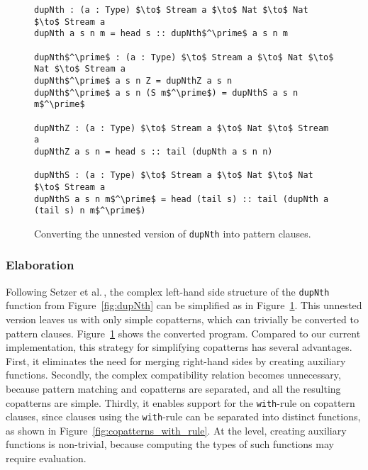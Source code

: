 \begin{figure}
\begin{lstlisting}[mathescape,title=\ttBlock]
dupNth : (a : Type) $\to$ Stream a $\to$ Nat $\to$ Nat $\to$ Stream a
dupNth a s n m = head s :: dupNth$^\prime$ a s n m

dupNth$^\prime$ : (a : Type) $\to$ Stream a $\to$ Nat $\to$ Nat $\to$ Stream a
dupNth$^\prime$ a s n Z = dupNthZ a s n
dupNth$^\prime$ a s n (S m$^\prime$) = dupNthS a s n m$^\prime$

dupNthZ : (a : Type) $\to$ Stream a $\to$ Nat $\to$ Stream a
dupNthZ a s n = head s :: tail (dupNth a s n n)

dupNthS : (a : Type) $\to$ Stream a $\to$ Nat $\to$ Nat $\to$ Stream a
dupNthS a s n m$^\prime$ = head (tail s) :: tail (dupNth a (tail s) n m$^\prime$)
\end{lstlisting}
  
  \caption{Converting the unnested version of \texttt{dupNth} into pattern clauses.}
  \label{fig:dupNth_unnesting_pattern_clauses}
\end{figure}

\subsubsection{Elaboration}
Following Setzer et al.\,\citep{Setzer14Unnesting}, the complex left-hand side
structure of the \texttt{dupNth} function from Figure~\ref{fig:dupNth} can be
simplified as in Figure~\ref{fig:dupNth_unnesting_pattern_clauses}. This unnested version leaves
us with only simple copatterns, which can trivially be converted to pattern
clauses. Figure~\ref{fig:dupNth_unnesting_pattern_clauses} shows the converted
program. Compared to our current implementation, this strategy for simplifying
copatterns has several advantages. First, it eliminates the need for merging
right-hand sides by creating auxiliary functions. Secondly, the complex
compatibility relation becomes unnecessary, because pattern matching and
copatterns are separated, and all the resulting copatterns are simple. Thirdly,
it enables support for the \texttt{with}-rule on copattern clauses, since
clauses using the \texttt{with}-rule can be separated into distinct functions,
as shown in Figure~\ref{fig:copatterns_with_rule}. At the \IdrisM{} level,
creating auxiliary functions is non-trivial, because computing the types of such
functions may require evaluation.

